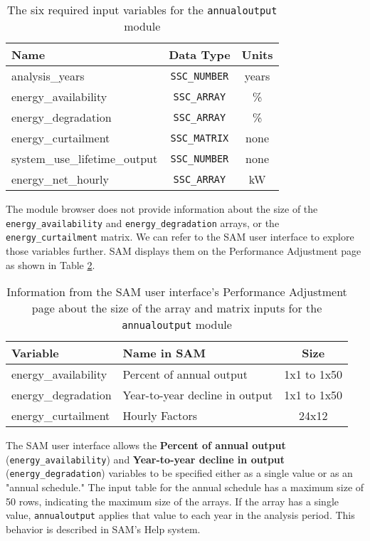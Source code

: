 \documentclass{article}
\begin{document}
\begin{table}
\begin{center}
\begin{tabular}{|l|c|c|}
\hline
Name & Data Type & Units \\
\hline
analysis\_years & \texttt{SSC\_NUMBER} & years \\
\hline
energy\_availability & \texttt{SSC\_ARRAY} & \% \\
\hline
energy\_degradation & \texttt{SSC\_ARRAY} & \% \\
\hline
energy\_curtailment & \texttt{SSC\_MATRIX} & none \\
\hline
system\_use\_lifetime\_output & \texttt{SSC\_NUMBER} &  none \\
\hline
energy\_net\_hourly & \texttt{SSC\_ARRAY} &  kW \\
\hline
\end{tabular}
\caption{The six required input variables for the \texttt{annualoutput} module}\label{tab_annualoutput}
\end{center}
\end{table}

The module browser does not provide information about the size of the \texttt{energy\_availability} and \texttt{energy\_degradation} arrays, or the \texttt{energy\_curtailment} matrix. We can refer to the SAM user interface to explore those variables further. SAM displays them on the Performance Adjustment page as shown in Table \ref{tab_performance_adjustment}.

 \begin{table}
\begin{center}
\begin{tabular}{|l|l|c|}
\hline
Variable & Name in SAM & Size \\
\hline
energy\_availability & Percent of annual output & 1x1 to 1x50 \\
\hline
energy\_degradation & Year-to-year decline in output & 1x1 to 1x50 \\
\hline
energy\_curtailment & Hourly Factors & 24x12 \\
\hline
\end{tabular}
\caption{Information from the SAM user interface's Performance Adjustment page about the size of the array and matrix inputs for the \texttt{annualoutput} module}\label{tab_performance_adjustment}
\end{center}
\end{table}

The SAM user interface allows the \textbf{Percent of annual output} (\texttt{energy\_availability}) and \textbf{Year-to-year decline in output} (\texttt{energy\_degradation}) variables to be specified either as a single value or as an "annual schedule." The input table for the annual schedule has a maximum size of 50 rows, indicating the maximum size of the arrays. If the array has a single value, \texttt{annualoutput} applies that value to each year in the analysis period. This behavior is described in SAM's Help system.
\end{document}
